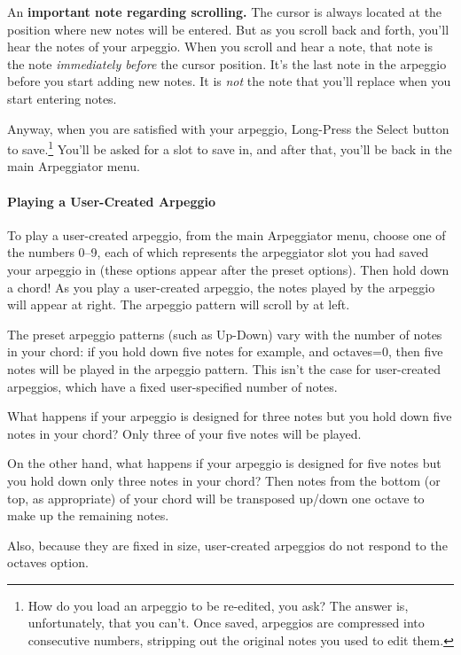 \documentclass{article}
\newcommand\bump{\vspace{11in}}
\begin{document}
An {\bf important note regarding scrolling.}  The cursor is always located at the position where new notes will be entered.  But as you scroll back and forth, you'll hear the notes of your arpeggio.  When you scroll and hear a note, that note is the note {\it immediately before} the cursor position.  It's the last note in the arpeggio before you start adding new notes. It is {\it not} the note that you'll replace when you start entering notes. 

Anyway, when you are satisfied with your arpeggio, Long-Press the Select button to save.\footnote{How do you load an arpeggio to be re-edited, you ask?  The answer is, unfortunately, that you can't.  Once saved, arpeggios are compressed into consecutive numbers, stripping out the original notes you used to edit them.}  You'll be asked for a slot to save in, and after that, you'll be back in the main Arpeggiator menu.

\paragraph{Playing a User-Created Arpeggio}

To play a user-created arpeggio, from the main Arpeggiator menu, choose one of the numbers 0--9, each of which represents the arpeggiator slot you had saved your arpeggio in (these options appear after the preset options).  Then hold down a chord!  As you play a user-created arpeggio, the notes played by the arpeggio will appear at right.  The arpeggio pattern will scroll by at left.


The preset arpeggio patterns (such as Up-Down) vary with the number of notes in your chord: if you hold down five notes for example, and octaves=0, then five notes will be played in the arpeggio pattern.  This isn't the case for user-created arpeggios, which have a fixed user-specified number of notes.

What happens if your arpeggio is designed for three notes but you hold down  five notes in your chord?  Only three of your five notes will be played.

\bump

On the other hand, what happens if your arpeggio is designed for five notes but you hold down only three notes in your chord?  Then notes from the bottom (or top, as appropriate) of your chord will be transposed up/down one octave to make up the remaining notes.

Also, because they are fixed in size, user-created arpeggios do not respond to the octaves option.
\end{document}
